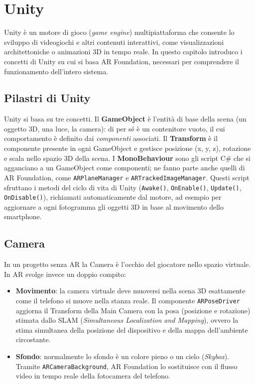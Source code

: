 \chapter{Unity}
Unity è un motore di gioco (\textit{game engine})\cite{Unity-1}\cite{Unity-2}\cite{Unity-3} \cite{Unity-General} multipiattaforma che consente lo sviluppo di videogiochi e altri contenuti interattivi, come visualizzazioni architettoniche o animazioni 3D in tempo reale. In questo capitolo introduco i concetti di Unity su cui si basa AR Foundation, necessari per comprendere il funzionamento dell'intero sistema.

\section{Pilastri di Unity}
Unity si basa su tre concetti. Il \textbf{GameObject} è l'entità di base della scena (un oggetto 3D, una luce, la camera): di per sé è un contenitore vuoto, il cui comportamento è definito dai \textit{componenti} associati. Il \textbf{Transform} è il componente presente in ogni GameObject e gestisce posizione (x, y, z), rotazione e scala nello spazio 3D della scena. I \textbf{MonoBehaviour} sono gli script C\# che si agganciano a un GameObject come componenti; ne fanno parte anche quelli di AR Foundation, come \texttt{ARPlaneManager} e \texttt{ARTrackedImageManager}. Questi script sfruttano i metodi del ciclo di vita di Unity (\texttt{Awake()}, \texttt{OnEnable()}, \texttt{Update()}, \texttt{OnDisable()}), richiamati automaticamente dal motore, ad esempio per aggiornare a ogni fotogramma gli oggetti 3D in base al movimento dello smartphone.

\section{Camera}
In un progetto senza AR la Camera è l'occhio del giocatore nello spazio virtuale. In AR svolge invece un doppio compito:

\begin{itemize}
    \item \textbf{Movimento}: la camera virtuale deve muoversi nella scena 3D esattamente come il telefono si muove nella stanza reale. Il componente \texttt{ARPoseDriver} aggiorna il Transform della Main Camera con la posa (posizione e rotazione) stimata dallo SLAM (\textit{Simultaneous Localization and Mapping}), ovvero la stima simultanea della posizione del dispositivo e della mappa dell'ambiente circostante.
    \item \textbf{Sfondo}: normalmente lo sfondo è un colore pieno o un cielo (\textit{Skybox}). Tramite \texttt{ARCameraBackground}, AR Foundation lo sostituisce con il flusso video in tempo reale della fotocamera del telefono.
\end{itemize}

